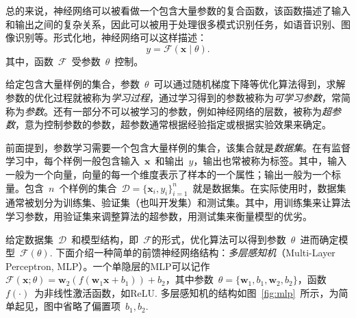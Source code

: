 总的来说，神经网络可以被看做一个包含大量参数的复合函数，该函数描述了输入和输出之间的复杂关系，因此可以被用于处理很多模式识别任务，如语音识别、图像识别等。形式化地，神经网络可以这样描述：
\begin{equation}
	y = \mathcal{F}(\mathbf{x} \mid \theta).
\end{equation}
其中，函数~$\mathcal{F}$~受参数~$\theta$~控制。

给定包含大量样例的集合，参数~$\theta$~可以通过随机梯度下降等优化算法得到，求解参数的优化过程就被称为\emph{学习过程}，通过学习得到的参数被称为\emph{可学习参数}，常简称为\emph{参数}。还有一部分不可以被学习的参数，例如神经网络的层数，被称为\emph{超参数}，意为控制参数的参数，超参数通常根据经验指定或根据实验效果来确定。

前面提到，参数学习需要一个包含大量样例的集合，该集合就是\emph{数据集}。在有监督学习中，每个样例一般包含输入~$\mathbf{x}$~和输出~$y$，输出也常被称为标签。其中，输入一般为一个向量，向量的每一个维度表示了样本的一个属性；输出一般为一个标量。包含~$n$~个样例的集合~$\mathcal{D} = \{ \mathbf{x}_i, y_i \}_{i=1}^n$~就是数据集。在实际使用时，数据集通常被划分为训练集、验证集（也叫开发集）和测试集。其中，用训练集来让算法学习参数，用验证集来调整算法的超参数，用测试集来衡量模型的优劣。

给定数据集~$\mathcal{D}$~和模型结构，即~$\mathcal{F}$的形式，优化算法可以得到参数~$\theta$~进而确定模型~$\mathcal{F}(\theta)$. 下面介绍一种简单的前馈神经网络结构：\emph{多层感知机}（Multi-Layer Perceptron, MLP）。一个单隐层的MLP可以记作~$\mathcal{F}(\mathbf{x}; \theta) = \mathbf{w}_2(f(\mathbf{w}_1\mathbf{x} + b_1))+b_2$，其中参数~$\theta = \{ \mathbf{w}_1, b_1, \mathbf{w}_2, b_2 \}$，函数~$f(\cdot)$~为非线性激活函数，如ReLU. 多层感知机的结构如图~\ref{fig:mlp}~所示，为简单起见，图中省略了偏置项~$b_1, b_2$.

